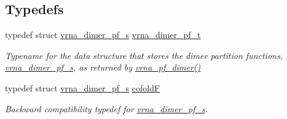 \subsection*{Typedefs}
\begin{DoxyCompactItemize}
\item 
\mbox{\label{group__pf__cofold_ga444df1587c9a2ca15b8eb25188f629c3}} 
typedef struct \hyperlink{group__pf__cofold_structvrna__dimer__pf__s}{vrna\+\_\+dimer\+\_\+pf\+\_\+s} \hyperlink{group__pf__cofold_ga444df1587c9a2ca15b8eb25188f629c3}{vrna\+\_\+dimer\+\_\+pf\+\_\+t}
\begin{DoxyCompactList}\small\item\em Typename for the data structure that stores the dimer partition functions, \hyperlink{group__pf__cofold_structvrna__dimer__pf__s}{vrna\+\_\+dimer\+\_\+pf\+\_\+s}, as returned by \hyperlink{group__pf__cofold_ga4e5c7d06c302a7c59fc0d64dc142ca63}{vrna\+\_\+pf\+\_\+dimer()} \end{DoxyCompactList}\item 
\mbox{\label{group__pf__cofold_ga5445d8d96a40e9e79b1fa5a7f1a6b7ea}} 
typedef struct \hyperlink{group__pf__cofold_structvrna__dimer__pf__s}{vrna\+\_\+dimer\+\_\+pf\+\_\+s} \hyperlink{group__pf__cofold_ga5445d8d96a40e9e79b1fa5a7f1a6b7ea}{cofoldF}
\begin{DoxyCompactList}\small\item\em Backward compatibility typedef for \hyperlink{group__pf__cofold_structvrna__dimer__pf__s}{vrna\+\_\+dimer\+\_\+pf\+\_\+s}. \end{DoxyCompactList}\end{DoxyCompactItemize}
